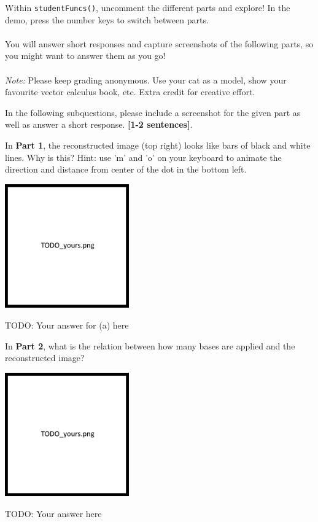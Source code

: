 \documentclass{csci1430}
\begin{document}
Within \verb!studentFuncs()!, uncomment the different parts and explore! In the demo, press the number keys to switch between parts.
\\
\\
You will answer short responses and capture screenshots of the following parts, so you might want to answer them as you go!
\\
\\
\emph{Note:} Please keep grading anonymous. Use your cat as a model, show your favourite vector calculus book, etc. Extra credit for creative effort.

\newpage

In the following subquestions, please include a screenshot for the given part as well as answer a short response. \textbf{[1-2 sentences]}.

\begin{subquestion}[points=2]
In \textbf{Part 1}, the reconstructed image (top right) looks like bars of black and white lines. Why is this? Hint: use 'm' and 'o' on your keyboard to animate the direction and distance from center of the dot in the bottom left.
\end{subquestion}

\begin{answer}[height=15]
\includegraphics[width=0.4\textwidth,keepaspectratio]{images/TODO_yours.png}

TODO: Your answer for (a) here
\end{answer}

\begin{subquestion}[points=2]
In \textbf{Part 2}, what is the relation between how many bases are applied and the reconstructed image?
\end{subquestion}

\begin{answer}[height=15]
\includegraphics[width=0.4\textwidth,keepaspectratio]{images/TODO_yours.png}

TODO: Your answer here
\end{answer}
\end{document}
